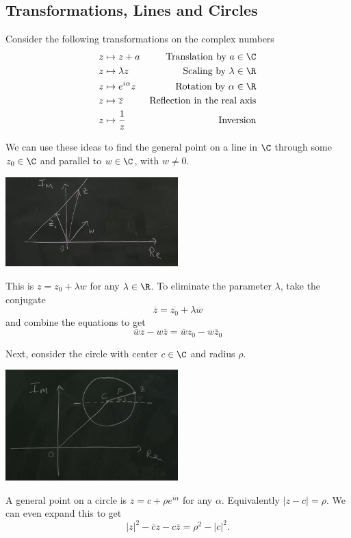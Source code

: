 \documentclass[a4]{scrartcl}
\begin{document}
\subsection{Transformations, Lines and Circles}

Consider the following transformations on the complex numbers
\begin{align*}
	z &\mapsto z + a & \text{Translation by }a \in \C \\
	z &\mapsto \lambda z & \text{Scaling by }\lambda \in \R\\
	z &\mapsto e^{i \alpha} z & \text{Rotation by } \alpha \in \R \\
	z &\mapsto \overline{z} & \text{Reflection in the real axis} \\
	z &\mapsto \frac{1}{z} & \text{Inversion} 
\end{align*}

We can use these ideas to find the general point on a line in $\C$ through some $z_0 \in \C$ and parallel to $w \in \C$, with $w \neq 0$.
\begin{center}
	\includegraphics[width=0.5\textwidth]{general_points.png}
\end{center}
This is $z = z_0 + \lambda w$ for any $\lambda \in \R$. To eliminate the parameter $\lambda$, take the conjugate
$$
\overline{z} = \overline{z_0} + \lambda \overline{w}
$$
and combine the equations to get
$$
\overline{w} z-w \overline{z}=\overline{w} z_{0}-w \overline{z}_{0}
$$

Next, consider the circle with center $c \in \C$ and radius $\rho$.
\begin{center}
	\includegraphics[width=0.5\textwidth]{general_circle.png}
\end{center}
A general point on a circle is $z = c + \rho e^{i \alpha}$ for any $\alpha$.
Equivalently $|z - c| = \rho$. We can even expand this to get
$$
|z|^2 - \overline{c} z - c\overline{z} = \rho^2 - |c|^2.
$$
\end{document}
